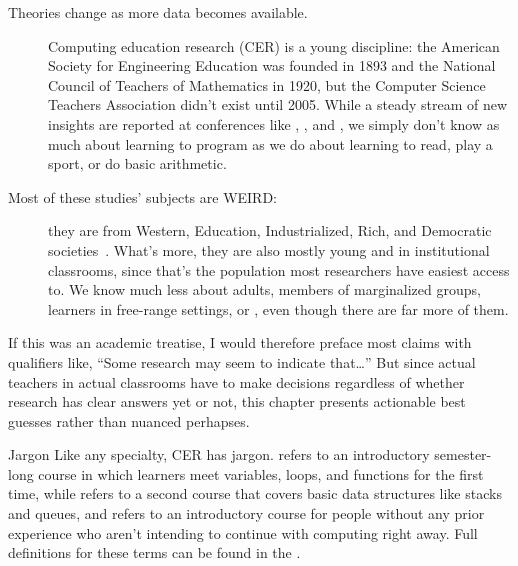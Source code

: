 \begin{description}

\item[Theories change as more data becomes available.]
  Computing education research (CER) is a young discipline:
  the American Society for Engineering Education was founded in 1893
  and the National Council of Teachers of Mathematics in 1920,
  but the Computer Science Teachers Association didn't exist until 2005.
  While a steady stream of new insights are reported at conferences like ,
  ,
  and ,
  we simply don't know as much about learning to program
  as we do about learning to read,
  play a sport,
  or do basic arithmetic.

\item[Most of these studies' subjects are WEIRD:]
  they are from Western, Education, Industrialized, Rich, and Democratic societies~\cite{Henr2010}.
  What's more,
  they are also mostly young and in institutional classrooms,
  since that's the population most researchers have easiest access to.
  We know much less about adults,
  members of marginalized groups,
  learners in free-range settings,
  or ,
  even though there are far more of them.

\end{description}

If this was an academic treatise,
I would therefore preface most claims with qualifiers like,
``Some research may seem to indicate that{\ldots}''
But since actual teachers in actual classrooms have to make decisions
regardless of whether research has clear answers yet or not,
this chapter presents actionable best guesses rather than nuanced perhapses.

\begin{aside}{Jargon}
  Like any specialty,
  CER has jargon.
   refers to an introductory semester-long course
  in which learners meet variables, loops, and functions for the first time,
  while  refers to a second course
  that covers basic data structures like stacks and queues,
  and  refers to an introductory course
  for people without any prior experience
  who aren't intending to continue with computing right away.
  Full definitions for these terms can be found in
  the .
\end{aside}

